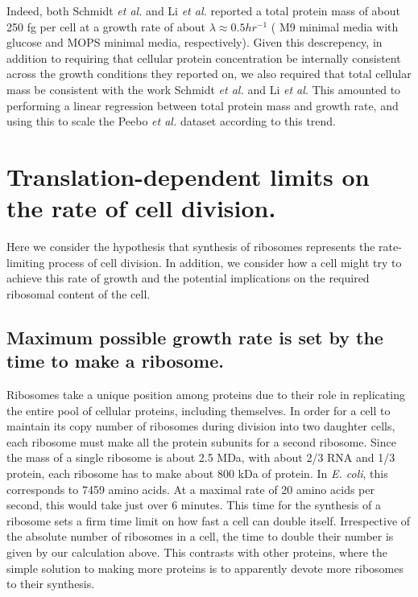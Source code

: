 \documentclass[11pt, letterpaper]{article}
\begin{document}
Indeed, both Schmidt {\it et al.} and Li {\it et al.} reported a total protein mass of about
250 fg per cell at a growth rate of about $\lambda \approx 0.5 hr^{-1}$ ( M9
minimal media with glucose and MOPS minimal media, respectively). Given this
descrepency, in addition to requiring that cellular protein concentration be
internally consistent across the growth conditions they reported on, we also
required that total cellular mass be consistent with the work Schmidt {\it et al.} and
Li {\it et al.} This amounted to performing a linear regression between total protein
mass and growth rate, and using this to scale the Peebo {\it et al.} dataset according
to this trend.



%
\newpage
\section{Translation-dependent limits on the rate of cell division.}

Here we consider the hypothesis that synthesis of ribosomes represents the
rate-limiting process of cell division. In addition, we consider how a cell
might try to achieve this rate of growth and the potential implications on the
required ribosomal content of the cell.

\subsection{Maximum possible growth rate is set by the time to make a ribosome.}


Ribosomes take a unique position among proteins due to their role in
replicating the entire pool of cellular proteins, including themselves. In
order for a cell to maintain its copy number of ribosomes during division into two
daughter cells, each ribosome must make all the protein subunits for a second
ribosome.  Since the  mass of a single ribosome is about 2.5 MDa, with about 2/3
RNA and 1/3 protein, each ribosome has to make about 800 kDa of protein. In {\it
E. coli}, this corresponds to 7459 amino acids. At a maximal rate of 20 amino
acids per second, this would take just over 6 minutes.  This time for the
synthesis of a ribosome sets a firm time limit on how fast a cell can double
itself. Irrespective of the absolute number of ribosomes in a cell, the time to
double their number is given by our calculation above. This contrasts with other
proteins, where the simple solution to making more proteins is to apparently
devote more ribosomes to their synthesis.
\end{document}
